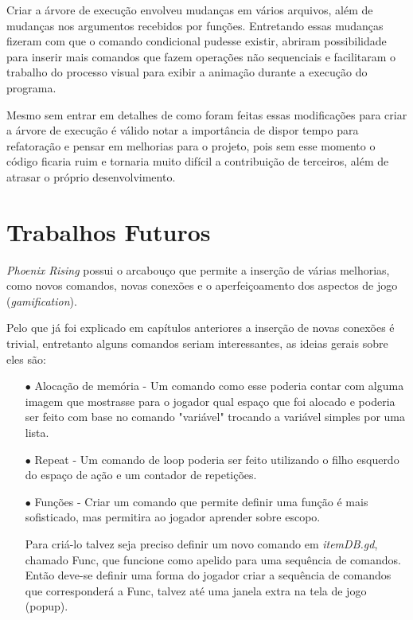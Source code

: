 Criar a árvore de execução envolveu mudanças em vários arquivos, além de 
mudanças nos argumentos recebidos por funções. Entretando essas mudanças 
fizeram com que o comando condicional pudesse existir, abriram possibilidade 
para inserir mais comandos que fazem operações não sequenciais e facilitaram o 
trabalho do processo visual para exibir a animação durante a execução do 
programa.

Mesmo sem entrar em detalhes de como foram feitas essas modificações para 
criar a árvore de execução é válido notar a importância de dispor tempo 
para refatoração e pensar em melhorias para o projeto, pois sem esse 
momento o código ficaria ruim e tornaria muito difícil a 
contribuição de terceiros, além de atrasar o próprio desenvolvimento.

\section{Trabalhos Futuros}

\textit{Phoenix Rising} possui o arcabouço que permite a inserção de várias 
melhorias, como novos comandos, novas conexões e o aperfeiçoamento dos 
aspectos de jogo (\textit{gamification}).

Pelo que já foi explicado em capítulos anteriores a inserção de novas conexões é
trivial, entretanto alguns comandos seriam interessantes, as ideias gerais
sobre eles são:

\begin{itemize}
    \item[$\bullet$]
        Alocação de memória - Um comando como esse poderia contar com 
        alguma imagem que mostrasse para o jogador qual espaço que foi alocado
        e poderia ser feito com base no comando "variável" trocando
        a variável simples por uma lista.
    \item[$\bullet$]
        Repeat - Um comando de loop poderia ser feito utilizando o filho 
        esquerdo do espaço de ação e um contador de repetições.
    \item[$\bullet$]
        Funções - Criar um comando que permite definir uma função é mais 
        sofisticado, mas permitira ao jogador aprender sobre escopo.
        
        Para criá-lo talvez seja preciso definir um novo comando em 
        \textit{itemDB.gd}, chamado Func, que funcione como apelido para uma 
        sequência de comandos. Então deve-se definir uma forma do jogador criar 
        a sequência de comandos que corresponderá a Func, talvez até uma janela 
        extra na tela de jogo (popup).
\end{itemize}

